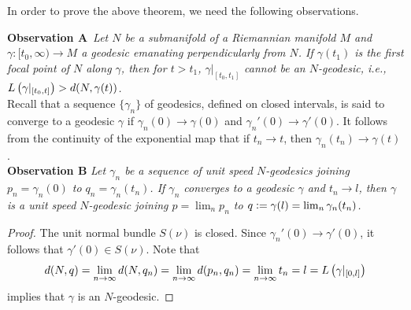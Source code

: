 \vspace{0.3cm}
\noindent In order to prove the above theorem, we need the following observations.

\vspace{0.3cm}
\noindent \textbf{Observation A}\,\textup{\cite[Lemma 2.11, page 96]{Sak96}}\,\,\textit{Let $N$ be a submanifold of a Riemannian manifold $M$ and $\gamma:[t_0,\infty)\to M$ a geodesic emanating perpendicularly from $N$. If $\gamma(t_1)$ is the first focal point of $N$ along $\gamma$, then for $t>t_1$, $\gamma|_{[t_0,t_1]}$ cannot be an $N$-geodesic, i.e., $L\left( \gamma|_{[t_0,t]} \right)>d(N,\gamma(t))$.}\\[0.2cm]
\noindent Recall that a sequence $\{\gamma_n\}$ of geodesics, defined on closed intervals, is said to converge to a geodesic $\gamma$ if $\gamma_{n}(0)\to \gamma(0)$ and $\gamma_n'(0)\to \gamma'(0)$. It follows from the continuity of the exponential map that if $t_n\to t$, then $\gamma_n(t_n)\to \gamma(t)$.\\[0.3cm]
\textbf{Observation B}\,\,\textit{Let $\gamma_n$ be a sequence of unit speed $N$-geodesics joining $p_n=\gamma_n(0)$ to $q_n=\gamma_n(t_n)$. If $\gamma_n$ converges to a geodesic $\gamma$ and $t_n\to l$, then $\gamma$ is a unit speed $N$-geodesic joining $p=\lim_n p_n$ to $q \vcentcolon= \gamma(l)=\lim_n \gamma_n(t_n)$.}
\begin{proof}
    The unit normal bundle $S(\nu)$ is closed. Since $\gamma_n'(0)\to \gamma'(0)$, it follows that $\gamma'(0)\in S(\nu)$. Note that
        \begin{displaymath}
        d(N,q) = \lim_{n\to \infty} d(N,q_n) = \lim_{n\to \infty} d(p_n,q_n)= \lim_{n\to \infty} t_n = l = L\left( \gamma|_{[0,l]} \right)
        \end{displaymath}
    implies that $\gamma$ is an $N$-geodesic.
\end{proof}

